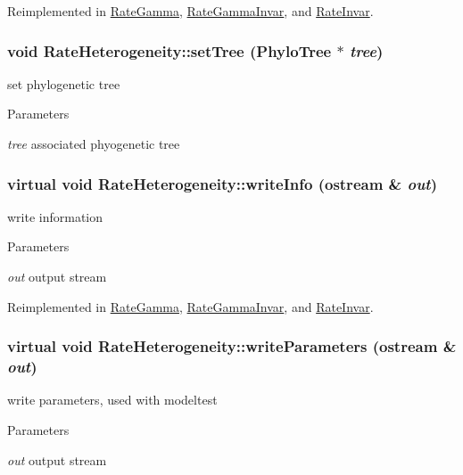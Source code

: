 Reimplemented in \hyperlink{classRateGamma_aadba870d743295ef057f9c78ac7fdd06}{RateGamma}, \hyperlink{classRateGammaInvar_ab72a2559cea978d312a243d521c2abef}{RateGammaInvar}, and \hyperlink{classRateInvar_a593bcac4c771b4b69c2f286ed8789793}{RateInvar}.\hypertarget{classRateHeterogeneity_a5333e4d51b14b79dbaa32df641891cbb}{
\subsubsection[{setTree}]{\setlength{\rightskip}{0pt plus 5cm}void RateHeterogeneity::setTree ({\bf PhyloTree} $\ast$ {\em tree})}}
\label{classRateHeterogeneity_a5333e4d51b14b79dbaa32df641891cbb}
set phylogenetic tree 
\begin{DoxyParams}{Parameters}
\item[{\em tree}]associated phyogenetic tree \end{DoxyParams}
\hypertarget{classRateHeterogeneity_a520772859d465036b6620bdbf2977efe}{
\subsubsection[{writeInfo}]{\setlength{\rightskip}{0pt plus 5cm}virtual void RateHeterogeneity::writeInfo (ostream \& {\em out})}}
\label{classRateHeterogeneity_a520772859d465036b6620bdbf2977efe}
write information 
\begin{DoxyParams}{Parameters}
\item[{\em out}]output stream \end{DoxyParams}


Reimplemented in \hyperlink{classRateGamma_a835bb210fd8fb4552613fe49875cbfb5}{RateGamma}, \hyperlink{classRateGammaInvar_a428c3ac79ba1bf28da546f602d4b0f7b}{RateGammaInvar}, and \hyperlink{classRateInvar_a6b8c198319557891db9b91fb47b27428}{RateInvar}.\hypertarget{classRateHeterogeneity_ad2832e686971cf1f2cac2a6f842a3550}{
\subsubsection[{writeParameters}]{\setlength{\rightskip}{0pt plus 5cm}virtual void RateHeterogeneity::writeParameters (ostream \& {\em out})}}
\label{classRateHeterogeneity_ad2832e686971cf1f2cac2a6f842a3550}
write parameters, used with modeltest 
\begin{DoxyParams}{Parameters}
\item[{\em out}]output stream \end{DoxyParams}


